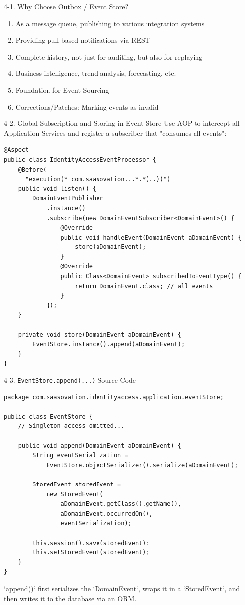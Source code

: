 \documentclass{beamer}
\begin{document}
\begin{frame}{4-1. Why Choose Outbox / Event Store?}
  \begin{enumerate}
    \item As a message queue, publishing to various integration systems
    \item Providing pull-based notifications via REST
    \item Complete history, not just for auditing, but also for replaying
    \item Business intelligence, trend analysis, forecasting, etc.
    \item Foundation for Event Sourcing
    \item Corrections/Patches: Marking events as invalid
  \end{enumerate}
\end{frame}

\begin{frame}[fragile]{4-2. Global Subscription and Storing in Event Store}
  \lstset{language=Java, basicstyle=\ttfamily\scriptsize}
  Use AOP to intercept all Application Services and register a subscriber that "consumes all events":
  \begin{lstlisting}
@Aspect
public class IdentityAccessEventProcessor {
    @Before(
      "execution(* com.saasovation...*.*(..))")
    public void listen() {
        DomainEventPublisher
            .instance()
            .subscribe(new DomainEventSubscriber<DomainEvent>() {
                @Override
                public void handleEvent(DomainEvent aDomainEvent) {
                    store(aDomainEvent);
                }
                @Override
                public Class<DomainEvent> subscribedToEventType() {
                    return DomainEvent.class; // all events
                }
            });
    }

    private void store(DomainEvent aDomainEvent) {
        EventStore.instance().append(aDomainEvent);
    }
}
  \end{lstlisting}
\end{frame}

\begin{frame}[fragile]{4-3. \texttt{EventStore.append(...)} Source Code}
  \lstset{language=Java, basicstyle=\ttfamily\scriptsize}
  \begin{lstlisting}
package com.saasovation.identityaccess.application.eventStore;

public class EventStore {
    // Singleton access omitted...

    public void append(DomainEvent aDomainEvent) {
        String eventSerialization =
            EventStore.objectSerializer().serialize(aDomainEvent);

        StoredEvent storedEvent =
            new StoredEvent(
                aDomainEvent.getClass().getName(),
                aDomainEvent.occurredOn(),
                eventSerialization);

        this.session().save(storedEvent);
        this.setStoredEvent(storedEvent);
    }
}
  \end{lstlisting}
  `append()` first serializes the `DomainEvent`, wraps it in a `StoredEvent`, and then writes it to the database via an ORM.
\end{frame}
\end{document}
